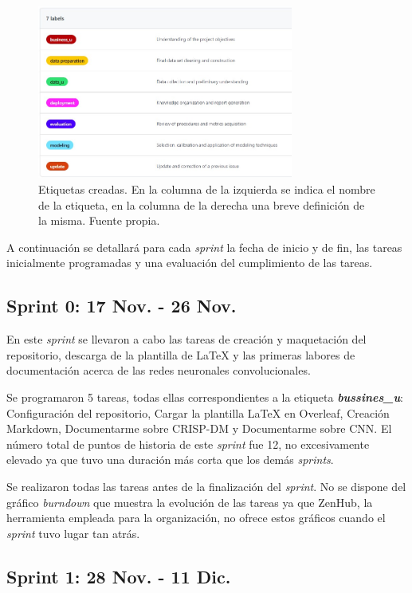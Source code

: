 \begin{figure}[h]
    \centering
    \includegraphics[width=0.75\textwidth]{img/labels_github.jpg}
    \caption{Etiquetas creadas. En la columna de la izquierda se indica el nombre de la etiqueta, en la columna de la derecha una breve definición de la misma. Fuente propia.}
    \label{labels:github}
\end{figure}

A continuación se detallará para cada \textit{sprint} la fecha de inicio y de fin, las tareas inicialmente programadas y una evaluación del cumplimiento de las tareas.

\subsection{Sprint 0: 17 Nov. - 26 Nov.}

En este \textit{sprint} se llevaron a cabo las tareas de creación y maquetación del repositorio, descarga de la plantilla de LaTeX y las primeras labores de documentación acerca de las redes neuronales convolucionales. 

Se programaron 5 tareas, todas ellas correspondientes a la etiqueta \textbf{\textit{bussines\_u}}: Configuración del repositorio, Cargar la plantilla LaTeX en Overleaf, Creación Markdown, Documentarme sobre CRISP-DM y Documentarme sobre CNN. El número total de puntos de historia de este \textit{sprint} fue 12, no excesivamente elevado ya que tuvo una duración más corta que los demás \textit{sprints}.

Se realizaron todas las tareas antes de la finalización del \textit{sprint}. No se dispone del gráfico \textit{burndown} que muestra la evolución de las tareas ya que ZenHub, la herramienta empleada para la organización, no ofrece estos gráficos cuando el \textit{sprint} tuvo lugar tan atrás.

\subsection{Sprint 1: 28 Nov. - 11 Dic.}


